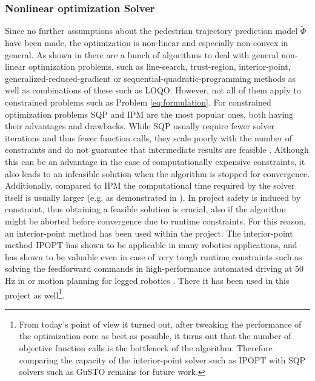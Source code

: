 \subsubsection{Nonlinear optimization Solver} 
Since no further assumptions about the pedestrian trajectory prediction model $\tilde{\Phi}$ have been made, the optimization is non-linear and especially non-convex in general. As shown in \cite{Gould2003}\cite{Parkinson2018}\cite{Freund2004} there are a bunch of algorithms to deal with general non-linear optimization problems, such as line-search, trust-region, interior-point, generalized-reduced-gradient or sequential-quadratic-programming methods as well as combinations of these such as LOQO. However, not all of them apply to constrained problems such as Problem \ref{eq:formulation}. For constrained optimization problems \ac{SQP} and \ac{IPM} are the most popular ones, both having their advantages and drawbacks. While \ac{SQP} usually require fewer solver iterations and thus fewer function calls, they scale poorly with the number of constraints and do not guarantee that intermediate results are feasible \cite{Dehdari2013}\cite{Parkinson2018}. Although this can be an advantage in the case of computationally expensive constraints, it also leads to an infeasible solution when the algorithm is stopped for convergence. Additionally, compared to \ac{IPM} the computational time required by the solver itself is usually larger (e.g. as demonstrated in \cite{Dehdari2013}).
\newline
In project \project safety is induced by constraint, thus obtaining a feasible solution is crucial, also if the algorithm might be aborted before convergence due to runtime constraints. For this reason, an interior-point method has been used within the project. The interior-point method \ac{IPOPT} \cite{Wachter2006} has shown to be applicable in many robotics applications, and has shown to be valuable even in case of very tough runtime constraints such as solving the feedforward commands in high-performance automated driving at 50 Hz in \cite{Spielberge2019} or motion planning for legged robotics \cite{Winkler2018}. There it has been used in this project as well\footnote{From today's point of view it turned out, after tweaking the performance of the optimization core as best as possible, it turns out that the number of objective function calls is the bottleneck of the algorithm. Therefore comparing the capacity of the interior-point solver such as \ac{IPOPT} with \ac{SQP} solvers such as \ac{GuSTO} remains for future work.}.

